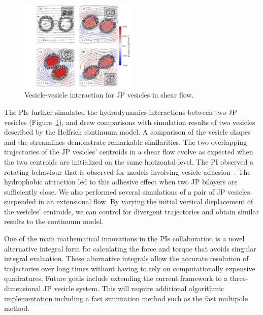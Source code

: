 \begin{figure}
\includegraphics[width=0.5\textwidth]{figures/PreliminaryWork/ShearDoublet.jpg}
\caption{\label{fig:JPv_interactions} Vesicle-vesicle interaction for JP
  vesicles in shear flow.}
\end{figure}
The PIs further simulated the hydrodynamics interactions between two JP
vesicles (Figure~\ref{fig:JPv_interactions}), and drew comparisons with
simulation results of two vesicles described by the Helfrich continuum
model. A comparison of the vesicle shapes and the streamlines
demonstrate remarkable similarities. The two overlapping trajectories of
the JP vesicles' centroids in a shear flow evolve as expected when the
two centroids are initialized on the same horizontal level. The PI
observed a rotating behaviour that is observed for models involving
vesicle adhesion~\cite{qua-vee-you2019, abb-far-ezz-ben-mis2021}. The
hydrophobic attraction led to this adhesive effect when two JP bilayers
are sufficiently close. We also performed several simulations of a pair
of JP vesicles suspended in an extensional flow. By varying the initial
vertical displacement of the vesicles' centroids, we can control for
divergent trajectories and obtain similar results to the continuum
model.

One of the main mathematical innovations in the PIs collaboration is a
novel alternative integral form for calculating the force and torque
that avoids singular integral evaluation. These alternative integrals
allow the accurate resolution of trajectories over long times without
having to rely on computationally expensive quadratures. Future goals
include extending the current framework to a three-dimensional JP
vesicle system. This will require additional algorithmic implementation
including a fast summation method such as the fast multipole method.

